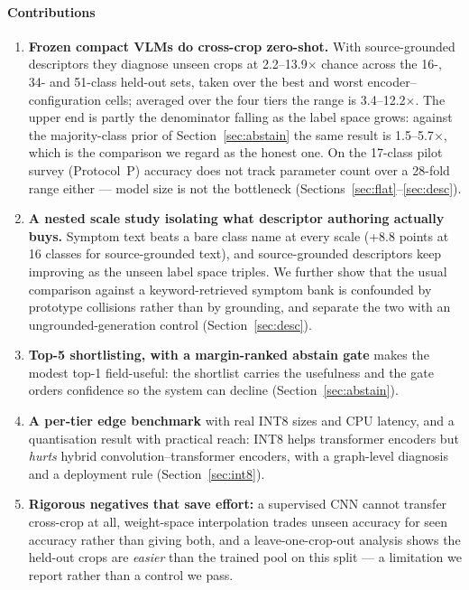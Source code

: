 \documentclass[a4paper,fleqn]{cas-dc}
\begin{document}
\paragraph{Contributions}
\begin{enumerate}
\item \textbf{Frozen compact VLMs do cross-crop zero-shot.} With source-grounded descriptors they diagnose
unseen crops at 2.2--13.9$\times$ chance across the 16-, 34- and 51-class held-out sets, taken
over the best and worst encoder--configuration cells; averaged over the four tiers the range is
3.4--12.2$\times$. The upper end is partly the denominator falling as the label space grows:
against the majority-class prior of Section~\ref{sec:abstain} the same result is 1.5--5.7$\times$,
which is the comparison we regard as the honest one. On the 17-class pilot survey (Protocol~P) accuracy does
not track parameter count over a 28-fold range either --- model size is not the bottleneck
(Sections~\ref{sec:flat}--\ref{sec:desc}).
\item \textbf{A nested scale study isolating what descriptor authoring actually buys.} Symptom text
beats a bare class name at every scale (+8.8 points at 16 classes for source-grounded text), and
source-grounded descriptors keep improving as the unseen label space triples. We further show that
the usual comparison against a keyword-retrieved symptom bank is confounded by prototype collisions
rather than by grounding, and separate the two with an ungrounded-generation control
(Section~\ref{sec:desc}).
\item \textbf{Top-5 shortlisting, with a margin-ranked abstain gate}
makes the modest top-1 field-useful: the shortlist carries the usefulness and the gate
orders confidence so the system can decline (Section~\ref{sec:abstain}).
\item \textbf{A per-tier edge benchmark} with real INT8 sizes and CPU latency, and a quantisation
result with practical reach: INT8 helps transformer encoders but \emph{hurts} hybrid
convolution--transformer encoders, with a graph-level diagnosis and a deployment rule
(Section~\ref{sec:int8}).
\item \textbf{Rigorous negatives that save effort:} a supervised CNN cannot transfer cross-crop at
all, weight-space interpolation trades unseen accuracy for seen accuracy rather than giving both,
and a leave-one-crop-out analysis shows the held-out crops are \emph{easier} than the trained pool
on this split --- a limitation we report rather than a control we pass.
\end{enumerate}
\end{document}
